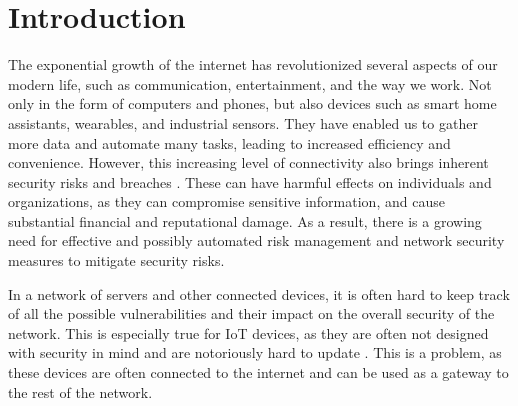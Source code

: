 \section{Introduction}
\label{sec:introduction}
The exponential growth of the internet has revolutionized several aspects of our modern life, such as communication, entertainment, and the way we work. Not only in the form of computers and phones, but also devices such as smart home assistants, wearables, and industrial sensors. They have enabled us to gather more data and automate many tasks, leading to increased efficiency and convenience. However, this increasing level of connectivity also brings inherent security risks and breaches \cite{khandelwal2016friday, wei2018casino}.  These can have harmful effects on individuals and organizations, as they can compromise sensitive information, and cause substantial financial and reputational damage.  As a result, there is a growing need for effective and possibly automated risk management and network security measures to mitigate security risks.

In a network of servers and other connected devices, it is often hard to keep track of all the possible vulnerabilities and their impact on the overall security of the network. This is especially true for IoT devices, as they are often not designed with security in mind \cite{miettinen2017iot} and are notoriously hard to update \cite{wurm2016security}. This is a problem, as these devices are often connected to the internet and can be used as a gateway to the rest of the network. 


